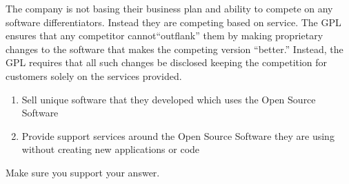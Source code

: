 \documentclass[10pt]{article}
\begin{document}
\begin{enumerate}
\begin{enumerate}
\begin{enumerate}
	The company is not basing their business plan and ability to compete on any software differentiators. Instead they are competing based on service. The GPL ensures that any competitor cannot``outflank'' them by making proprietary changes to the software that makes the competing version  ``better.'' Instead, the GPL requires that all such changes be disclosed keeping the competition for customers solely on the services provided.
	\bigskip
\end{enumerate}
\else
\begin{enumerate} 
	\item Sell unique software that they developed which uses the Open Source Software
	\bigskip
	\bigskip
	\bigskip
	\bigskip
	\bigskip
	\bigskip
	\bigskip
	\bigskip
	\item Provide support services around the Open Source Software they are using without creating new applications or code
	\bigskip
	\bigskip
	\bigskip
	\bigskip
	\bigskip
	\bigskip
	\bigskip
	\bigskip
\end{enumerate}
\fi
Make sure you support your answer.
\end{enumerate}


\end{enumerate}
\end{document}

